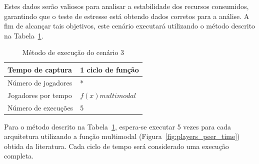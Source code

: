 Estes dados serão valiosos para analisar a estabilidade dos recursos consumidos, garantindo que o teste de estresse está obtendo dados corretos para a análise.
%
A fim de alcançar tais objetivos, este cenário executará utilizando o método descrito na Tabela~\ref{tab:cenario_3}.

\begin{table}[htb!]
\centering
\caption{Método de execução do cenário 3}
\label{tab:cenario_3}
\begin{tabular}{|l|l|}
\hline
Tempo de captura    &  1 ciclo de função \\ \hline
Número de jogadores & *                 \\ \hline
Jogadores por tempo & $f(x) multimodal$ \\ \hline
Número de execuções & 5                 \\ \hline 
\end{tabular}
\end{table}

Para o método descrito na Tabela~\ref{tab:cenario_3}, espera-se executar 5 vezes para cada arquitetura utilizando a função multimodal (Figura~\ref{fig:players_peer_time}) obtida da literatura.
Cada ciclo de tempo será considerado uma execução completa.


% 
